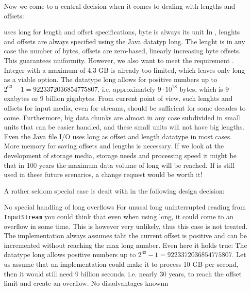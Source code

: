 Now we come to a central decision when it comes to dealing with lengths and offsets:

{%
\LibName{} uses long for length and offset specifications, byte is always its unit
}
{%
In \LibName{}, lenghts and offsets are always specified using the Java datatyp long. The lenght is in any case the number of bytes, offsets are zero-based, linearly increasing byte offsets.
}
{%
This guarantees uniformity. However, we also want to meet the requirement . Integer with a maximum of 4.3 GB is already too limited, which leaves only long as a viable option. The datatype long allows for positive numbers up to $2^{63}-1=9223372036854775807$, i.e. approximately $9\cdot 10^{18}$ bytes, which is 9 exabytes or 9 billion gigabytes. From current point of view, such lenghts and offsets for input media, even for streams, should be sufficient for some decades to come. Furthermore, big data chunks are almost in any case subdivided in small units that can be easier handled, and these small units will not have big lengths. Even the Java file I/O uses long as offset and length datatype in most cases.
}
{%
More memory for saving offsets and lengths is necessary. If we look at the development of storage media, storage needs and processing speed it might be that in 100 years the maximum data volume of long will be reached. If \LibName{} is still used in these future scenarios, a change request would be worth it!
}

A rather seldom special case is dealt with in the following design decision:

{%
No special handling of long overflows
}
{%
For unusal long uninterrupted reading from \texttt{InputStream} you could think that even when using long, it could come to an overflow in some time. This is however very unlikely, thus this case is not treated. The implementation always assumes taht the current offset is positive and can be incremented without reaching the max long number.
}
{%
Even here it holds true: The datatype long allows positive numbers up to $2^{63}-1=9223372036854775807$. Let us assume that an implementation could make it to process 10 GB per second, then it would still need 9 billion seconds, i.e. nearly 30 years, to reach the offset limit and create an overflow.
}
{%
No disadvantages knownn
}

